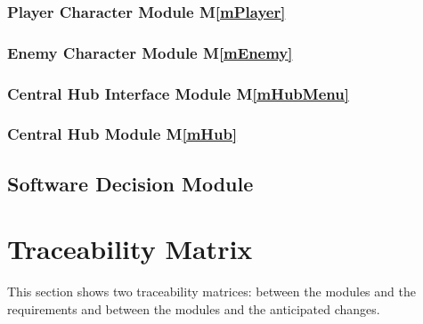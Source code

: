 \documentclass[12pt, titlepage]{article}
\begin{document}
\subsubsection{Player Character Module M\ref{mPlayer}}


\subsubsection{Enemy Character Module M\ref{mEnemy}}


\subsubsection{Central Hub Interface Module M\ref{mHubMenu}}


\subsubsection{Central Hub Module M\ref{mHub}}


\subsection{Software Decision Module}


\newpage{}

\section{Traceability Matrix} \label{SecTM}

This section shows two traceability matrices: between the modules and the
requirements and between the modules and the anticipated changes.
\end{document}
